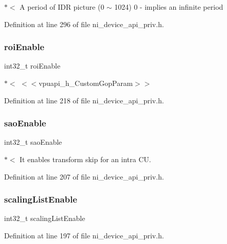 $\ast$$<$ A period of I\+DR picture (0 $\sim$ 1024) 0 -\/ implies an infinite period 

Definition at line 296 of file ni\+\_\+device\+\_\+api\+\_\+priv.\+h.

\mbox{\label{struct__ni__t408__config__t_af75c3567740c6fbc3baa8c4c72fd0df7}} 
\subsubsection{\texorpdfstring{roiEnable}{roiEnable}}
{\footnotesize\ttfamily int32\+\_\+t roi\+Enable}

$\ast$$<$ $<$$<$vpuapi\+\_\+h\+\_\+\+Custom\+Gop\+Param$>$$>$ 

Definition at line 218 of file ni\+\_\+device\+\_\+api\+\_\+priv.\+h.

\mbox{\label{struct__ni__t408__config__t_a6d4631089bf8d8cac1a887c3ed10bd8d}} 
\subsubsection{\texorpdfstring{saoEnable}{saoEnable}}
{\footnotesize\ttfamily int32\+\_\+t sao\+Enable}

$\ast$$<$ It enables transform skip for an intra CU. 

Definition at line 207 of file ni\+\_\+device\+\_\+api\+\_\+priv.\+h.

\mbox{\label{struct__ni__t408__config__t_a873d55ac2de5582c0ada6e56bac05b55}} 
\subsubsection{\texorpdfstring{scalingListEnable}{scalingListEnable}}
{\footnotesize\ttfamily int32\+\_\+t scaling\+List\+Enable}



Definition at line 197 of file ni\+\_\+device\+\_\+api\+\_\+priv.\+h.


